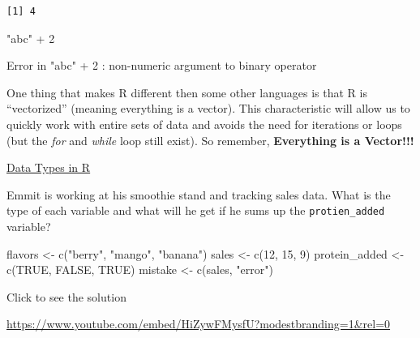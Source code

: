 \documentclass[
  letterpaper,
  DIV=11,
  numbers=noendperiod]{scrreprt}
\newenvironment{Shaded}{\begin{snugshade}}{\end{snugshade}}
\newcommand{\ConstantTok}[1]{\textcolor[rgb]{0.56,0.35,0.01}{#1}}
\newcommand{\DecValTok}[1]{\textcolor[rgb]{0.68,0.00,0.00}{#1}}
\newcommand{\FunctionTok}[1]{\textcolor[rgb]{0.28,0.35,0.67}{#1}}
\newcommand{\NormalTok}[1]{\textcolor[rgb]{0.00,0.23,0.31}{#1}}
\newcommand{\OtherTok}[1]{\textcolor[rgb]{0.00,0.23,0.31}{#1}}
\newcommand{\SpecialCharTok}[1]{\textcolor[rgb]{0.37,0.37,0.37}{#1}}
\newcommand{\StringTok}[1]{\textcolor[rgb]{0.13,0.47,0.30}{#1}}
\begin{document}
\begin{verbatim}
[1] 4
\end{verbatim}

\begin{Shaded}
\begin{Highlighting}[]
\StringTok{"abc"} \SpecialCharTok{+} \DecValTok{2}
\end{Highlighting}
\end{Shaded}

{Error in "abc" + 2 : non-numeric argument to binary operator}

One thing that makes R different then some other languages is that R is
``vectorized'' (meaning everything is a vector). This characteristic
will allow us to quickly work with entire sets of data and avoids the
need for iterations or loops (but the \emph{for} and \emph{while} loop
still exist). So remember, \textbf{Everything is a Vector!!!}

\begin{watch}{}{}
    \href{https://youtu.be/6m-hh-NG0X0}{Data Types in R}
\end{watch}

\begin{tcolorbox}[enhanced jigsaw, leftrule=.75mm, arc=.35mm, coltitle=black, rightrule=.15mm, bottomrule=.15mm, toprule=.15mm, left=2mm, colbacktitle=quarto-callout-tip-color!10!white, title=\textcolor{quarto-callout-tip-color}{\faLightbulb}\hspace{0.5em}{Try it Out}, toptitle=1mm, breakable, colframe=quarto-callout-tip-color-frame, bottomtitle=1mm, titlerule=0mm, colback=white, opacityback=0, opacitybacktitle=0.6]

Emmit is working at his smoothie stand and tracking sales data. What is
the type of each variable and what will he get if he sums up the
\texttt{protien\_added} variable?

\begin{Shaded}
\begin{Highlighting}[]
\NormalTok{flavors }\OtherTok{\textless{}{-}} \FunctionTok{c}\NormalTok{(}\StringTok{"berry"}\NormalTok{, }\StringTok{"mango"}\NormalTok{, }\StringTok{"banana"}\NormalTok{)}
\NormalTok{sales }\OtherTok{\textless{}{-}} \FunctionTok{c}\NormalTok{(}\DecValTok{12}\NormalTok{, }\DecValTok{15}\NormalTok{, }\DecValTok{9}\NormalTok{)}
\NormalTok{protein\_added }\OtherTok{\textless{}{-}} \FunctionTok{c}\NormalTok{(}\ConstantTok{TRUE}\NormalTok{, }\ConstantTok{FALSE}\NormalTok{, }\ConstantTok{TRUE}\NormalTok{)}
\NormalTok{mistake }\OtherTok{\textless{}{-}} \FunctionTok{c}\NormalTok{(sales, }\StringTok{"error"}\NormalTok{)}
\end{Highlighting}
\end{Shaded}

Click to see the solution

\url{https://www.youtube.com/embed/HiZywFMysfU?modestbranding=1&rel=0}

\end{tcolorbox}
\end{document}
